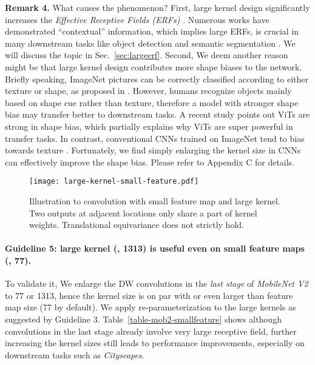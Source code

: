 \documentclass[10pt,twocolumn,letterpaper]{article}
\begin{document}
\noindent \textbf{Remark 4.} 
What causes the phenomenon? First, large kernel design significantly increases the \emph{Effective Receptive Fields (ERFs)} \cite{erf}. Numerous works have demonstrated ``contextual'' information, which implies large ERFs, is crucial in many downstream tasks like object detection and semantic segmentation \cite{peng2017large,long2015fully,yu2017dilated,wang2020deep,yu2015multi}. We will discuss the topic in Sec.~\ref{sec:largeerf}. 
Second, We deem another reason might be that large kernel design contributes more shape biases to the network. Briefly speaking, ImageNet pictures can be correctly classified according to either texture or shape, as proposed in \cite{geirhos2018imagenet,brendel2019approximating}. However, humans recognize objects mainly based on shape cue rather than texture, therefore a model with stronger shape bias may transfer better to downstream tasks. A recent study \cite{tuli2021convolutional} points out ViTs are strong in shape bias, which partially explains why ViTs are super powerful in transfer tasks. In contrast, conventional CNNs trained on ImageNet tend to bias towards texture \cite{geirhos2018imagenet,brendel2019approximating}. Fortunately, we find simply enlarging the kernel size in CNNs can effectively improve the shape bias. Please refer to Appendix C for details.
	
	\begin{figure}
		\begin{center}
			\texttt{[image: large-kernel-small-feature.pdf]}
			\vspace{-0.25in}
			\caption{Illustration to convolution with small feature map and large kernel. Two outputs at adjacent locations only share a part of kernel weights. Translational equivariance does not strictly hold.}
			\label{fig-large-kernel-small-feature}
			\vspace{-0.15in}
		\end{center}
	\end{figure}
	
	\vspace{-0.15in}\paragraph{Guideline 5: large kernel (\eg, 13\bm{}13) is useful even on small feature maps (\eg, 7\bm{}7).} 
	To validate it, We enlarge the DW convolutions in the \emph{last stage} of \emph{MobileNet V2} to 77 or 1313, hence the kernel size is on par with or even larger than feature map size (77 by default). We apply re-parameterization to the large kernels as suggested by Guideline 3. Table~\ref{table-mob2-smallfeature} shows although convolutions in the last stage already involve very large receptive field, further increasing the kernel sizes still leads to performance improvements, especially on downstream tasks such as \emph{Cityscapes}. 
	
\end{document}
